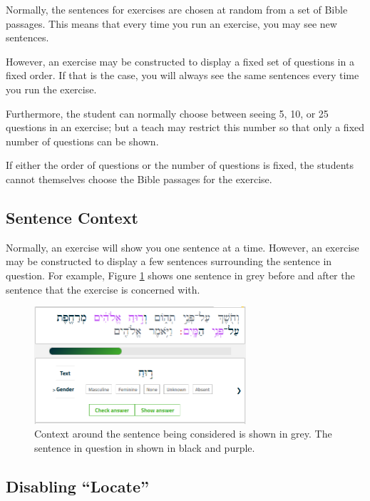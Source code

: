 \documentclass[11pt,oneside,a4paper]{memoir}
\begin{document}
Normally, the sentences for exercises are chosen at random from a set of Bible passages. This means
that every time you run an exercise, you may see new sentences.

However, an exercise may be constructed to display a fixed set of questions in a fixed order. If
that is the case, you will always see the same sentences every time you run the exercise.

Furthermore, the student can normally choose between seeing 5, 10, or 25 questions in an exercise;
but a teach may restrict this number so that only a fixed number of questions can be shown.

If either the order of questions or the number of questions is fixed, the students cannot themselves
choose the Bible passages for the exercise.

\subsection{Sentence Context}

Normally, an exercise will show you one sentence at a time. However, an exercise may be constructed
to display a few sentences surrounding the sentence in question. For example, Figure
\ref{fig-context} shows one sentence in grey before and after the sentence that the exercise is
concerned with.

\begin{figure}
  \begin{center}
    \includegraphics[width=0.7\textwidth]{fig-context.png}
  \end{center}
  \caption{Context around the sentence being considered is shown in grey. The sentence in question
    in shown in black and purple.}\label{fig-context}
\end{figure}


\subsection{Disabling ``Locate''}
\end{document}
